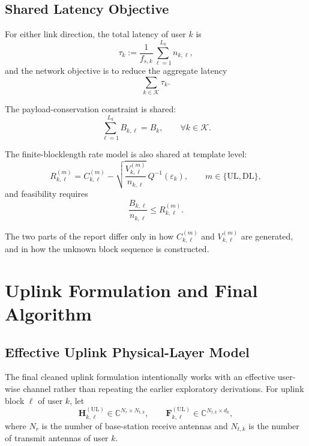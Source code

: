 \documentclass[11pt]{article}
\newcommand{\Kset}{\mathcal{K}}
\newcommand{\C}{\mathbb{C}}
\newcommand{\F}{\mathbf{F}}
\newcommand{\Hc}{\mathbf{H}}
\newcommand{\UL}{\mathrm{UL}}
\newcommand{\DL}{\mathrm{DL}}
\begin{document}
\subsection{Shared Latency Objective}
For either link direction, the total latency of user $k$ is
\begin{equation}
\tau_k
:=
\frac{1}{f_{s,k}} \sum_{\ell=1}^{L_k} n_{k,\ell},
\label{eq:latency-common}
\end{equation}
and the network objective is to reduce the aggregate latency
\begin{equation}
\sum_{k \in \Kset} \tau_k.
\label{eq:network-latency-common}
\end{equation}

The payload-conservation constraint is shared:
\begin{equation}
\sum_{\ell=1}^{L_k} B_{k,\ell} = B_k,
\qquad
\forall k \in \Kset.
\label{eq:payload-common}
\end{equation}

The finite-blocklength rate model is also shared at template level:
\begin{equation}
R_{k,\ell}^{(m)}
=
C_{k,\ell}^{(m)}
-
\sqrt{\frac{V_{k,\ell}^{(m)}}{n_{k,\ell}}}\,
Q^{-1}(\varepsilon_k),
\qquad
m \in \{\UL,\DL\},
\label{eq:fbl-template}
\end{equation}
and feasibility requires
\begin{equation}
\frac{B_{k,\ell}}{n_{k,\ell}} \le R_{k,\ell}^{(m)}.
\label{eq:fbl-feasibility-common}
\end{equation}

The two parts of the report differ only in how $C_{k,\ell}^{(m)}$ and $V_{k,\ell}^{(m)}$ are generated, and in how the unknown block sequence is constructed.

\clearpage
\section{Uplink Formulation and Final Algorithm}
\subsection{Effective Uplink Physical-Layer Model}
The final cleaned uplink formulation intentionally works with an effective user-wise channel rather than repeating the earlier exploratory derivations. For uplink block $\ell$ of user $k$, let
\[
\Hc_{k,\ell}^{(\UL)} \in \C^{N_r \times N_{t,k}},
\qquad
\F_{k,\ell}^{(\UL)} \in \C^{N_{t,k} \times d_k},
\]
where $N_r$ is the number of base-station receive antennas and $N_{t,k}$ is the number of transmit antennas of user $k$.
\end{document}
